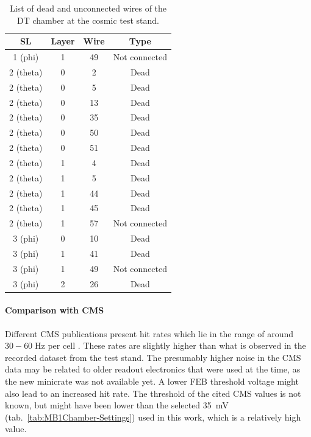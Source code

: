 \begin{table}[htb]
    \centering
    \begin{tabular}{|c|c|c|c|}  %
        \hline
        \acl{SL} & Layer & Wire & Type \\ \hline
        1 (phi) & 1 & 49 & Not connected \\ %
        2 (theta) & 0 & 2 & Dead \\ 
        2 (theta) & 0 & 5 & Dead \\ 
        2 (theta) & 0 & 13 & Dead \\ 
        2 (theta) & 0 & 35 & Dead \\ 
        2 (theta) & 0 & 50 & Dead \\ 
        2 (theta) & 0 & 51 & Dead \\ 
        2 (theta) & 1 & 4 & Dead \\ 
        2 (theta) & 1 & 5 & Dead \\ 
        2 (theta) & 1 & 44 & Dead \\ 
        2 (theta) & 1 & 45 & Dead \\ 
        2 (theta) & 1 & 57 & Not connected \\ %
        3 (phi) & 0 & 10 & Dead \\ 
        3 (phi) & 1 & 41 & Dead \\ 
        3 (phi) & 1 & 49 & Not connected \\ 
        3 (phi) & 2 & 26 & Dead \\ \hline
    \end{tabular}
    \caption{List of dead and unconnected wires of the \ac{DT} chamber at the cosmic test stand.}
    \label{tab:DTData-DeadWires}
\end{table}
\paragraph{Comparison with CMS}
Different \ac{CMS} publications present hit rates which lie in the range of around $30-60\;\si{\hertz}$ per cell \cite{CMS-Main,CMS-DT-TestBeam-2004}. These rates are slightly higher than what is observed in the recorded dataset from the test stand. The presumably higher noise in the \ac{CMS} data may be related to older readout electronics that were used at the time, as the new minicrate was not available yet. A lower \ac{FEB} threshold voltage might also lead to an increased hit rate. The threshold of the cited \ac{CMS} values is not known, but might have been lower than the selected \SI{35}{\milli\volt} (tab.\ \ref{tab:MB1Chamber-Settings}) used in this work, which is a relatively high value.
